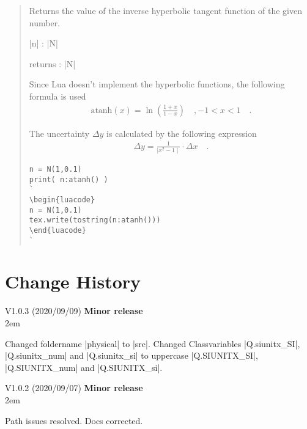 \documentclass{ltxdoc}
\begin{document}
\begin{quote}
  Returns the value of the inverse hyperbolic tangent function of the given number.

  \begin{description}
  \item |n| : |N|

  \item returns : |N|
  \end{description}

  Since Lua doesn't implement the hyperbolic functions, the following formula is used
  \begin{align*}
    \text{atanh}(x) = \ln\left( \frac{1 + x}{1 - x} \right)  \quad, -1 < x < 1 \quad.
  \end{align*}

  The uncertainty $\Delta y$ is calculated by the following expression
  \begin{align*}
    \Delta y = \frac{1}{\mid x^2 - 1 \mid} \cdot \Delta x \quad.
  \end{align*}



\begin{lstlisting}
n = N(1,0.1)
print( n:atanh() )
`
\begin{luacode}
n = N(1,0.1)
tex.write(tostring(n:atanh()))
\end{luacode}
`
\end{lstlisting}

\end{quote}










\newpage
\section{Change History}


\newcommand{\vhist}[4]{
#1 \quad (#2) \qquad \textbf{#3} \\
\hangindent2em
#4
\vspace{1em}
}


\vhist{V1.0.3}{2020/09/09}{Minor release}{ 
  Changed foldername |physical| to |src|. Changed Classvariables |Q.siunitx\_SI|, |Q.siunitx\_num| and |Q.siunitx\_si| to uppercase |Q.SIUNITX\_SI|, |Q.SIUNITX\_num| and |Q.SIUNITX\_si|.
}

\vhist{V1.0.2}{2020/09/07}{Minor release}{ 
  Path issues resolved. Docs corrected.
}
\end{document}
